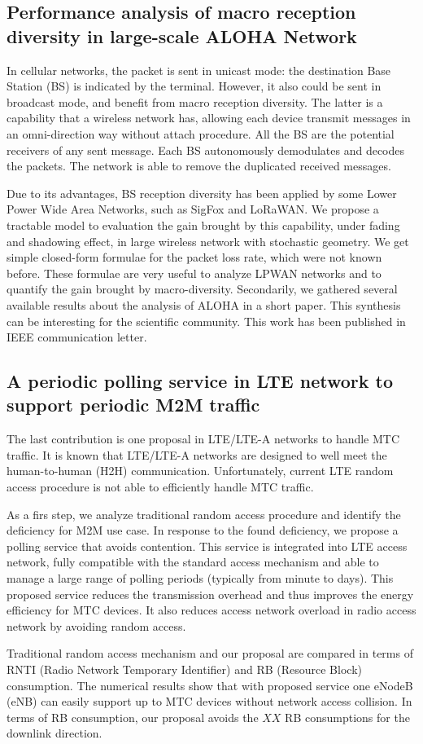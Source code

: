 \subsection{Performance analysis of macro reception diversity in large-scale ALOHA Network}
In cellular networks, the packet is sent in unicast mode: the destination Base Station (BS) is indicated by the terminal. However, it also could be sent in broadcast mode, and benefit from macro reception diversity. The latter is a capability that a wireless network has,  allowing each device transmit messages in an omni-direction way without attach procedure. All the BS are the potential receivers of any sent message. Each BS autonomously demodulates and decodes the packets. The network is able to remove the duplicated received messages. 

Due to its advantages, BS reception diversity has been applied by some Lower Power Wide Area Networks, such as SigFox and LoRaWAN. We propose a tractable model to evaluation the gain brought by this capability, under fading and shadowing effect, in large wireless network with stochastic geometry. We get simple closed-form formulae for the packet loss rate, which were not known before. These formulae are very useful to analyze LPWAN networks and to quantify the gain brought by macro-diversity. Secondarily, we gathered several available results about the analysis of ALOHA in a short paper. This synthesis can be interesting for the scientific community. This work has been published in IEEE communication letter.

\subsection{A periodic polling service in LTE network to support periodic M2M traffic}
The last contribution is one proposal in LTE/LTE-A networks to handle MTC traffic. It is known that LTE/LTE-A networks are designed to well meet the human-to-human (H2H) communication. Unfortunately, current LTE random access procedure is not able to efficiently handle MTC traffic. 

As a firs step, we analyze traditional random access procedure and identify the deficiency for M2M use case. In response to the found deficiency, we propose a polling service that avoids contention. This service is integrated into LTE access network, fully compatible with the standard access mechanism and able to manage a large range of polling periods (typically from  minute to  days).
This proposed service reduces the transmission overhead and thus improves the energy efficiency for MTC devices. It also reduces access network overload in radio access network by avoiding random access. 

Traditional random access mechanism and our proposal are compared in terms of RNTI (Radio Network Temporary Identifier) and RB (Resource Block) consumption. The numerical results show that with proposed service one eNodeB (eNB) can easily support up to  MTC devices without network access collision. In terms of RB consumption, our proposal avoids the $XX$ RB consumptions for the downlink direction. 
